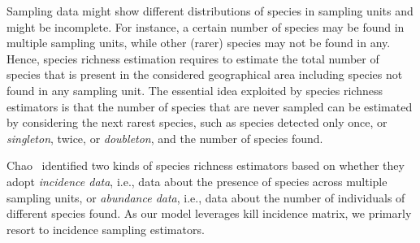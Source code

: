 \documentclass[sigconf,review,anonymous]{acmart}
\begin{document}
Sampling data might show different distributions of species in sampling units
and might be incomplete.
%
For instance, a certain number of species may be found in multiple sampling units,
while other (rarer) species may not be found in any. %
%
Hence, %
species richness estimation %
requires to estimate the total number of species that is present
in the considered geographical area including species not found in
any sampling unit.
The essential idea exploited by species richness estimators is that the number
of species that are never sampled %
can be estimated by considering the next rarest species, such as species
detected only once, or \emph{singleton}, twice, or \emph{doubleton}, %
and the number of species found. %
%

Chao~\cite{chao2016species} identified two kinds of species richness
estimators based on whether they adopt \emph{incidence data}, i.e., data about the
presence of species across multiple sampling units, or \emph{abundance data}, i.e.,
data about the number of individuals of different species found.
As our model leverages kill incidence matrix, we primarly resort to incidence sampling estimators.


%

\end{document}
